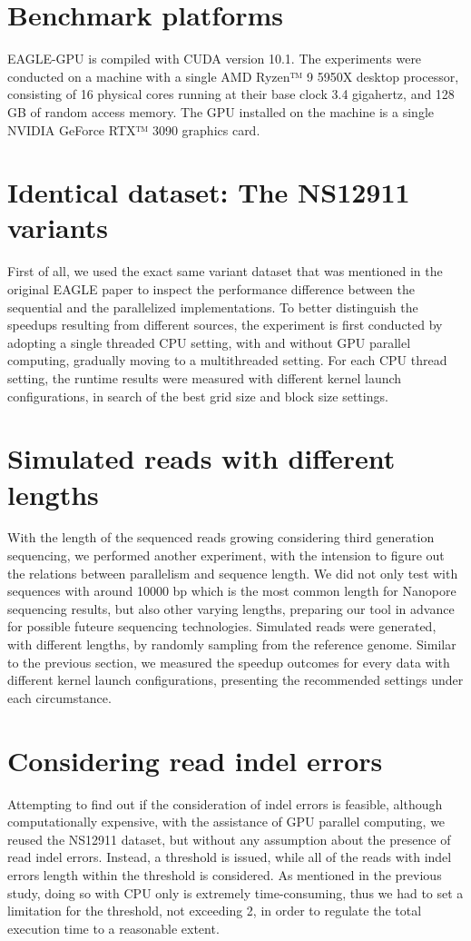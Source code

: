 \documentclass{PHlab-thesis}
\begin{document}
\section{Benchmark platforms}
EAGLE-GPU is compiled with CUDA version 10.1. The experiments were conducted on a machine with a single AMD Ryzen™ 9 5950X desktop processor, consisting of 16 physical cores running at their base clock 3.4 gigahertz, and 128 GB of random access memory. The GPU installed on the machine is a single NVIDIA GeForce RTX™ 3090 graphics card.

\section{Identical dataset: The NS12911 variants}
First of all, we used the exact same variant dataset that was mentioned in the original EAGLE paper to inspect the performance difference between the sequential and the parallelized implementations. To better distinguish the speedups resulting from different sources, the experiment is first conducted by adopting a single threaded CPU setting, with and without GPU parallel computing, gradually moving to a multithreaded setting. For each CPU thread setting, the runtime results were measured with different kernel launch configurations, in search of the best grid size and block size settings.

\section{Simulated reads with different lengths}
With the length of the sequenced reads growing considering third generation sequencing, we performed another experiment, with the intension to figure out the relations between parallelism and sequence length. We did not only test with sequences with around 10000 bp which is the most common length for Nanopore sequencing results, but also other varying lengths, preparing our tool in advance for possible futeure sequencing technologies. Simulated reads were generated, with different lengths, by randomly sampling from the reference genome. Similar to the previous section, we measured the speedup outcomes for every data with different kernel launch configurations, presenting the recommended settings under each circumstance.

\section{Considering read indel errors}
Attempting to find out if the consideration of indel errors is feasible, although computationally expensive, with the assistance of GPU parallel computing, we reused the NS12911 dataset, but without any assumption about the presence of read indel errors. Instead, a threshold is issued, while all of the reads with indel errors length within the threshold is considered. As mentioned in the previous study, doing so with CPU only is extremely time-consuming, thus we had to set a limitation for the threshold, not exceeding 2, in order to regulate the total execution time to a reasonable extent.
\end{document}
